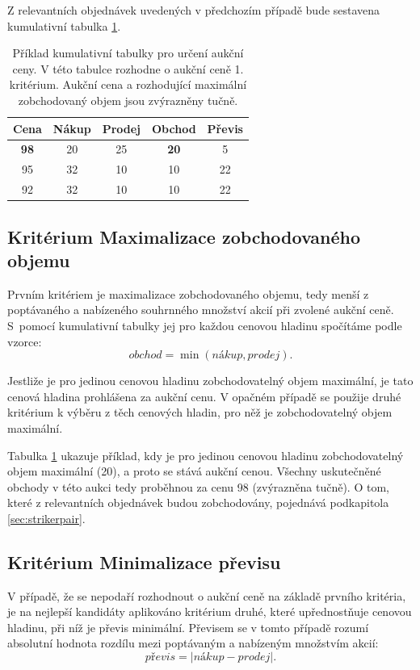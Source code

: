 \documentclass[thesis=M,czech]{FITthesis}[2012/06/26]
\begin{document}
Z relevantních objednávek uvedených v předchozím případě bude sestavena kumulativní tabulka \ref{tab:pricecalcex1}.

\begin{table}\centering
	\begin{tabular}{|c|c|c|c|c|}\hline
		Cena		& Nákup	& Prodej	& Obchod		& Převis	\tabularnewline \hline \hline
		\textbf{98} 	& 20 		& 25 		& \textbf{20} 	& 5 		\tabularnewline \hline
		95 		& 32 		& 10 		& 10 			& 22 		\tabularnewline \hline
		92 		& 32 		& 10 		& 10 			& 22 		\tabularnewline \hline
	\end{tabular}
	\caption[Příklad tabulky pro určení aukční ceny]{Příklad kumulativní tabulky pro určení aukční ceny. V této tabulce rozhodne
		o aukční ceně 1. kritérium. Aukční cena a rozhodující maximální zobchodovaný objem jsou zvýrazněny tučně.}
	\label{tab:pricecalcex1}
\end{table}


\subsection{Kritérium Maximalizace zobchodovaného objemu}

Prvním kritériem je maximalizace zobchodovaného objemu, tedy menší z poptávaného a nabízeného souhrnného množství akcií 
při zvolené aukční ceně. S~pomocí kumulativní tabulky jej pro každou cenovou hladinu spočítáme podle vzorce: 
\[obchod = \min(nákup, prodej).\] 

Jestliže je pro jedinou cenovou hladinu zobchodovatelný objem maximální, je tato cenová hladina prohlášena za 
aukční cenu. V opačném případě se použije druhé kritérium k výběru z těch cenových hladin, pro něž je zobchodovatelný
objem maximální.

Tabulka \ref{tab:pricecalcex1} ukazuje příklad, kdy je pro jedinou cenovou hladinu zobchodovatelný objem maximální (20), 
a proto se stává aukční cenou. Všechny uskutečněné obchody v této aukci tedy proběhnou za cenu 98 (zvýrazněna tučně).
O tom, které z relevantních objednávek budou zobchodovány, pojednává podkapitola \ref{sec:strikerpair}.


\subsection{Kritérium Minimalizace převisu}

V případě, že se nepodaří rozhodnout o aukční ceně na základě prvního kritéria, je na nejlepší kandidáty aplikováno kritérium
druhé, které upřednostňuje cenovou hladinu, při níž je převis minimální. Převisem se v tomto případě rozumí absolutní hodnota 
rozdílu mezi poptávaným a nabízeným množstvím akcií: 
\[převis = \left| nákup - prodej \right|.\] 
\end{document}
